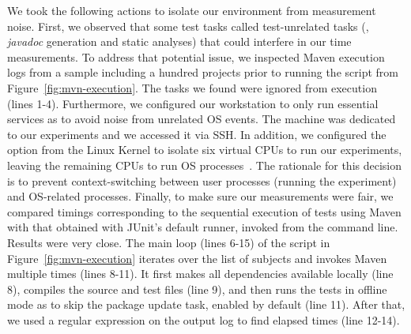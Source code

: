 We took the following actions to isolate our environment from
measurement noise.
First, we observed that some test tasks called test-unrelated tasks
(\eg, \emph{javadoc} generation and static analyses) that could
interfere in our time measurements.
To address that potential issue, we inspected Maven execution logs
from a sample including a hundred projects prior to running the script
from Figure~\ref{fig:mvn-execution}.
The tasks we found were ignored from execution (lines 1-4).
Furthermore, we configured
our workstation to only run essential services as to avoid noise from unrelated OS events.
The machine was dedicated to our experiments and we
accessed it via SSH. In addition, we configured the 
option from the Linux Kernel \cite{linux-kernel} to isolate six
virtual CPUs to run our experiments, leaving the remaining CPUs to run
OS processes~\cite{isolcpus-use}.  The rationale for this decision is
to prevent context-switching between user processes (running the
experiment) and OS-related processes.  Finally, to make sure our
measurements were fair, we compared timings corresponding to the
sequential execution of tests using Maven with that obtained with
JUnit's default  runner, invoked from the command
line.  Results were very close.
The main loop (lines 6-15) of the script in
Figure~\ref{fig:mvn-execution} iterates over the list of subjects and
invokes Maven multiple times (lines 8-11).  It first makes all dependencies available locally
(line 8), compiles the source and test files (line 9), and then runs
the tests in offline mode as to skip the package update task, enabled
by default (line 11). After that, we used a regular expression on
the output log to find elapsed times (line 12-14).



